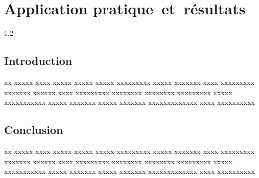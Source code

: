 \chapter{Application pratique et résultats}
\begin{spacing}{1.2}
\minitoc
\thispagestyle{MyStyle}
\end{spacing}
\newpage

\section{Introduction}
xx xxxxx xxxx xxxxx xxxxx xxxxx xxxxxxxxx xxxxx xxxxxxx xxxx xxxxxxxxx xxxxxxx xxxxxx xxxx xxxxxxxxx xxxxxxxx xxxxxxxx xxxxxxxxx xxxxx xxxxxxxxxxx xxxxx xxxxxxx xxxxx xxxxxxx xxxxxxxxxxxxx xxxx xxxxxxxxxx

\section{Conclusion}
xx xxxxx xxxx xxxxx xxxxx xxxxx xxxxxxxxx xxxxx xxxxxxx xxxx xxxxxxxxx xxxxxxx xxxxxx xxxx xxxxxxxxx xxxxxxxx xxxxxxxx xxxxxxxxx xxxxx xxxxxxxxxxx xxxxx xxxxxxx xxxxx xxxxxxx xxxxxxxxxxxxx xxxx xxxxxxxxxx